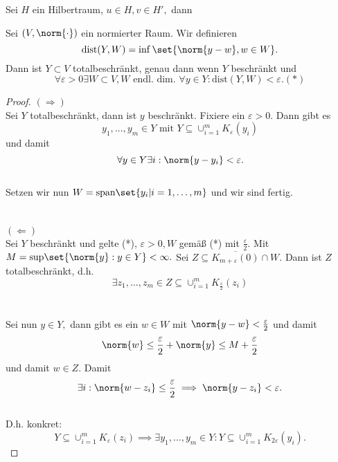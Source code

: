 \begin{ex} Sei $H$ ein Hilbertraum, $u \in H, v \in H',$ dann 
	
\end{ex}


\begin{theorem} Sei $(V, \norm{\cdot})$ ein normierter Raum. Wir definieren \[\text{dist}(Y, W) = \inf{\set{\norm{y-w}, w \in W}}.\] Dann ist $Y \subset V$ totalbeschränkt, genau dann wenn $Y$ beschränkt und \[\forall \varepsilon >0 \exists W \subset V, W \text{ endl. dim. } \forall y \in Y: \text{dist}(Y, W) < \varepsilon. (*)\]
	
	\begin{proof} $(\Rightarrow)$ \\
		
		Sei $Y$ totalbeschränkt, dann ist $y$ beschränkt. Fixiere ein $\varepsilon > 0.$ Dann gibt es \[y_1, \ldots, y_m \in Y \text{ mit } Y \subseteq \cup_{i = 1}^m K_{\varepsilon}(y_i)\] und damit \[\forall y \in Y \exists i: \norm{y- y_i} < \varepsilon.\] \\
		Setzen wir nun $W = \text{span}\set{y_i | i = 1, \ldots, m}$ und wir sind fertig. \\ \\ \\
		$(\Leftarrow)$ \\
		Sei $Y$ beschränkt und gelte (*), $\varepsilon > 0, W$ gemäß (*) mit $\frac{\varepsilon}{2}.$ Mit $M = \text{sup}{\set{\norm{y}: y \in Y}} < \infty.$ Sei $Z\subseteq \overline{K_{m + \varepsilon}(0)} \cap W.$ Dann ist $Z$ totalbeschränkt, d.h. \[\exists z_1, \ldots, z_m \in Z \subseteq \cup_{i = 1}^m K_{\frac{\varepsilon}{2}}(z_i)\] \\ \\
		Sei nun $y \in Y,$ dann gibt es ein $w \in W$ mit $\norm{y - w} < \frac{\varepsilon}{2}$ und damit \[\norm{w} \leq \frac{\varepsilon}{2} + \norm{y} \leq M + \frac{\varepsilon}{2}\] und damit $w \in Z.$ Damit \[\exists i: \norm{w - z_i} \leq \frac{\varepsilon}{2} \implies \norm{y-z_i} < \varepsilon.\] \\ D.h. konkret: \\
		\[Y \subseteq \cup_{i = 1}^m K_{\varepsilon}(z_i) \implies \exists y_1, \ldots, y_m \in Y: Y \subseteq \cup_{i = 1}^m K_{2 \varepsilon}(y_i).\]
	\end{proof}
	
\end{theorem}